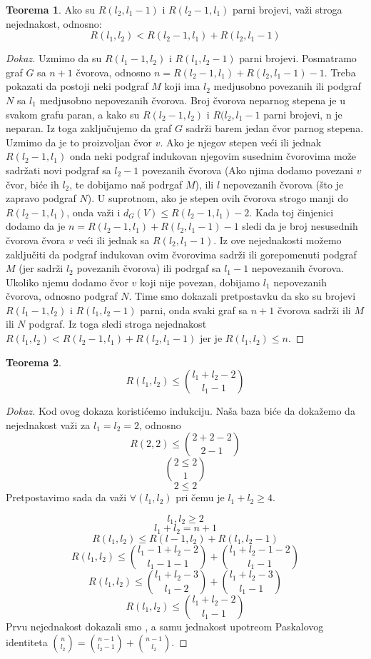 \documentclass{article}
\theoremstyle{definition}
\newtheorem{teorema}{Teorema}[section]
\newcommand{\dokaz}[1]{\begin{proof}[Dokaz]#1\end{proof}}
\begin{document}
	\begin{teorema}
		Ako su $R(l_2, l_1-1)$ i $R(l_2-1, l_1)$ parni brojevi, važi stroga nejednakost, odnosno: 
		\[
		R(l_1,l_2) < R(l_2-1, l_1) + R(l_2, l_1-1)
		\]
	\end{teorema}
	\dokaz{
		Uzmimo da su $R(l_1-1, l_2)$ i $R(l_1, l_2-1)$ parni brojevi. Posmatramo graf $G$ sa $n+1$ čvorova, odnosno $n=R(l_2-1, l_1)+ R(l_2, l_1-1)-1$.
		Treba pokazati da postoji neki podgraf $M$ koji ima $l_2$ medjusobno povezanih ili podgraf $N$ sa $l_1$ medjusobno nepovezanih čvorova. Broj čvorova neparnog stepena je u svakom grafu paran, a kako su $R(l_2-1, l_2)$ i $R(l_2, l_1-1$ parni brojevi, n je neparan. Iz toga zaključujemo da graf $G$ sadrži barem jedan čvor parnog stepena. Uzmimo da je to proizvoljan čvor $v$. Ako je njegov stepen veći ili jednak $R(l_2-1,l_1)$ onda neki podgraf indukovan njegovim susednim čvorovima može sadržati novi podgraf sa $l_2-1$ povezanih čvorova (Ako njima dodamo povezani $v$ čvor, biće ih $l_2$, te dobijamo naš podrgaf $M$), ili $l$ nepovezanih čvorova (što je zapravo podgraf $N$). 
		\newline
		U suprotnom, ako je stepen ovih čvorova strogo manji do $R(l_2-1,l_1)$, onda važi i $d_G(V) \leq R(l_2-1, l_1)-2$. Kada toj činjenici dodamo da je $n=R(l_2-1, l_1)+ R(l_2, l_1-1)-1$ sledi da je broj nesusednih čvorova čvora $v$ veći ili jednak sa $R(l_2, l_1-1)$. Iz ove nejednakosti možemo zaključiti da podgraf indukovan ovim čvorovima sadrži ili gorepomenuti podgraf $M$ (jer sadrži $l_2$ povezanih čvorova) ili podrgaf sa $l_1-1$ nepovezanih čvorova. Ukoliko njemu dodamo čvor $v$ koji nije povezan, dobijamo $l_1$ nepovezanih čvorova, odnosno podgraf $N$.
		\newline
		Time smo dokazali pretpostavku da sko su brojevi $R(l_1-1, l_2)$ i $R(l_1, l_2-1)$ parni, onda svaki graf sa $n+1$ čvorova sadrži ili $M$ ili $N$ podgraf. Iz toga sledi stroga nejednakost $R(l_1,l_2) < R(l_2-1, l_1) + R(l_2, l_1-1)$ jer je $R(l_1,l_2) \leq n$. 
	}
	
	
	
	
	\begin{teorema}
		\[R(l_1,l_2) \leq {l_1+l_2-2\choose l_1-1} 
		\]
	\end{teorema}
	\dokaz{
		Kod ovog dokaza koristićemo indukciju. Naša baza biće da dokažemo da nejednakost važi za $l_1=l_2=2$, odnosno
		\[ R(2,2) \leq {2+2-2 \choose 2-1}
		\]
		\[
		2 \leq 2 \choose 1
		\]
		\[
		2 \leq 2
		\]
		Pretpostavimo sada da važi $\forall(l_1,l_2)$  pri čemu je $l_1+l_2 \geq 4$.
		
		\[l_1,l_2 \geq 2
		\]
		\[
		l_1+l_2=n+1
		\]
		\[
		R(l_1,l_2) \leq R(l-1, l_2) + R(l_1, l_2-1)
		\]
		\[
		R(l_1,l_2) \leq {{l_1-1+l_2-2 \choose l_1-1-1} + {l_1+l_2-1-2 \choose l_1-1}}
		\]
		\[
		R(l_1,l_2) \leq {{l_1+l_2-3 \choose l_1-2} + {l_1+l_2-3 \choose l_1-1}}
		\]
		\[
		R(l_1,l_2) \leq {l_1+l_2-2 \choose l_1-1}
		\]
		Prvu nejednakost dokazali smo %
		, a samu jednakost upotreom Paskalovog identiteta ${n \choose l_2} = {n-1 \choose l_2-1} + {n-1 \choose l_2}$.
	}
	
\end{document}
